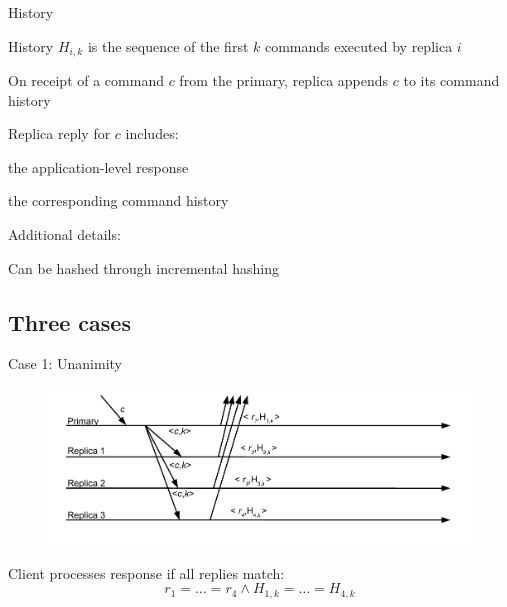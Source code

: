 \begin{frame}{History}

\BIL
\item \alert{History $H_{i,k}$} is the sequence of the first $k$ commands executed by
replica $i$

\item On receipt of a command $c$ from the primary, replica appends $c$ to its
command history 
\item Replica reply for $c$ includes: 
	\BI
	\item the application-level response
	\item the corresponding command history
	\EI
\item Additional details:
	\BI
	\item Can be hashed through \alert{incremental hashing}
	\EI

\EI

\end{frame}

\subsection{Three cases}

\begin{frame}{Case 1: Unanimity}
	
\begin{figure}
	\includegraphics[width=\textwidth]{messages6}	
\end{figure}

\BIL
\item Client processes response if all replies match:
\[
  r_1 = \ldots =r_ 4 \wedge H_{1,k} = \ldots = H_{4,k}
\]
\EIL

\end{frame}

